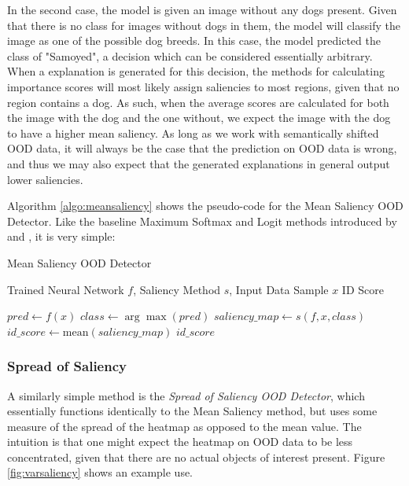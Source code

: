 \documentclass[UKenglish]{uiomasterthesis} %
\theoremstyle{definition}
\begin{document}
In the second case, the model is given an image without any dogs present. Given that there is no class for images without dogs in them, the model will classify the image as one of the possible dog breeds. In this case, the model predicted the class of "Samoyed", a decision which can be considered essentially arbitrary. When a explanation is generated for this decision, the methods for calculating importance scores will most likely assign saliencies to most regions, given that no region contains a dog. As such, when the average scores are calculated for both the image with the dog and the one without, we expect the image with the dog to have a higher mean saliency. As long as we work with semantically shifted OOD data, it will always be the case that the prediction on OOD data is wrong, and thus we may also expect that the generated explanations in general output lower saliencies.

Algorithm \ref{algo:meansaliency} shows the pseudo-code for the Mean Saliency OOD Detector. Like the baseline Maximum Softmax and Logit methods introduced by \cite{oodbaseline} and \cite{mls}, it is very simple:

\begin{algorithm}
    \caption{Mean Saliency OOD Detector}
    \label{algo:meansaliency}
    \begin{algorithmic}
    \Require Trained Neural Network $f$, Saliency Method $s$, Input Data Sample $x$
    \Ensure ID Score

        \State $pred \gets f(x)$
        \State $class \gets \arg\max(pred)$
        \State $saliency\_map \gets s(f, x, class)$
        \State $id\_score \gets \text{mean}(saliency\_map)$
        \State \Return $id\_score$
    \EndFunction

    \end{algorithmic}
\end{algorithm}



\subsubsection{Spread of Saliency}

A similarly simple method is the {\it Spread of Saliency OOD Detector}, which essentially functions identically to the Mean Saliency method, but uses some measure of the spread of the heatmap as opposed to the mean value. The intuition is that one might expect the heatmap on OOD data to be less concentrated, given that there are no actual objects of interest present. Figure \ref{fig:varsaliency} shows an example use.
\end{document}
